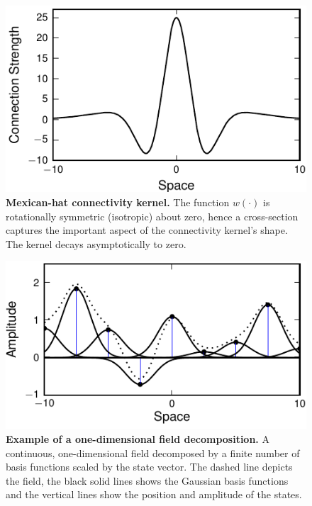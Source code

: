 \documentclass[12pt]{iopart}
\begin{document}
\begin{figure}[!ht]
\begin{center}
\includegraphics{./Graph/pdf/Figure1.pdf} 
\end{center}
\caption{{\bf Mexican-hat connectivity kernel.} The function $w(\cdot)$ is rotationally symmetric (isotropic) about zero, hence a cross-section captures the important aspect of the connectivity kernel's shape. The kernel decays asymptotically to zero.}
\label{fig:Figure1}
\end{figure}

\begin{figure}[!ht]
\begin{center}
\includegraphics{./Graph/pdf/Figure2.pdf} 
\end{center}
\caption{{\bf Example of a one-dimensional field decomposition.} A continuous, one-dimensional field decomposed by a finite number of basis functions scaled by the state vector. The dashed line depicts the field, the black solid lines shows the Gaussian basis functions and the vertical lines show the position and amplitude of the states.} 
\label{fig:Figure2}
\end{figure}
\end{document}
